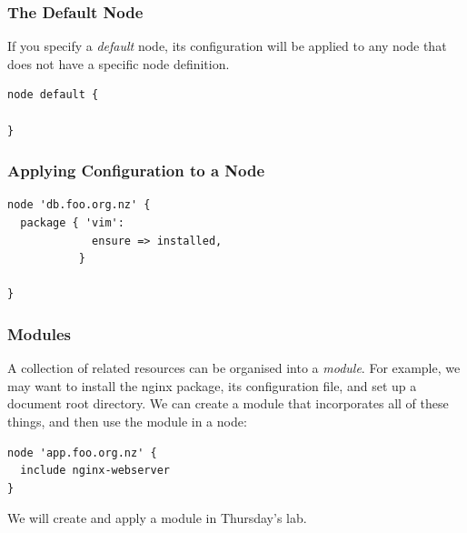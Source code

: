 \documentclass[10pt]{beamer}
\begin{document}
\begin{frame}[fragile]
  \frametitle{The Default Node}

If you specify a \emph{default} node, its configuration will be applied to any node that does not have a specific node definition.
\begin{verbatim}
node default {

}
\end{verbatim}


\end{frame}

\begin{frame}[fragile]
  \frametitle{Applying Configuration to a Node}



\begin{verbatim}
node 'db.foo.org.nz' {
  package { 'vim':
             ensure => installed,
           }  
              
}
\end{verbatim}


\end{frame}


\begin{frame}[fragile]
  \frametitle{Modules}
  A collection of related resources can be organised into a \emph{module}.  For example, we may want to install the nginx package, its configuration file, and set up a document root directory.  We can create a module that incorporates all of these things, and then use the module in a node:

\begin{verbatim}
node 'app.foo.org.nz' {
  include nginx-webserver
}
\end{verbatim}

We will create and apply a module in Thursday's lab.



\end{frame}
\end{document}
